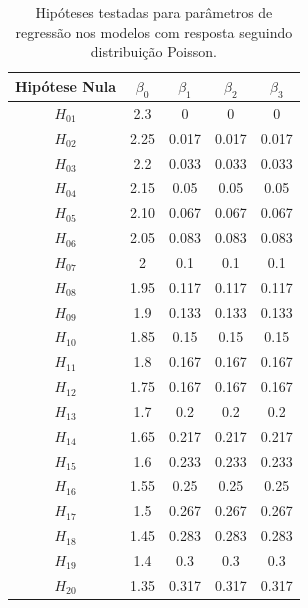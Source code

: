 \documentclass[AMA,STIX1COL]{WileyNJD-v2}
\begin{document}
\begin{table}[H]
\centering
\begin{tabular}{c|cccc}
\hline
Hipótese Nula & $\beta_0$ & $\beta_1$ & $\beta_2$ & $\beta_3$ \\ \hline
$H_{01}$      & 2.3       & 0         & 0         & 0         \\
$H_{02}$      & 2.25      & 0.017     & 0.017     & 0.017     \\
$H_{03}$      & 2.2       & 0.033     & 0.033     & 0.033     \\
$H_{04}$      & 2.15      & 0.05      & 0.05      & 0.05      \\
$H_{05}$      & 2.10      & 0.067     & 0.067     & 0.067     \\
$H_{06}$      & 2.05      & 0.083     & 0.083     & 0.083     \\
$H_{07}$      & 2         & 0.1       & 0.1       & 0.1       \\
$H_{08}$      & 1.95      & 0.117     & 0.117     & 0.117     \\
$H_{09}$      & 1.9       & 0.133     & 0.133     & 0.133     \\
$H_{10}$      & 1.85      & 0.15      & 0.15      & 0.15      \\
$H_{11}$      & 1.8       & 0.167     & 0.167     & 0.167     \\
$H_{12}$      & 1.75      & 0.167     & 0.167     & 0.167     \\
$H_{13}$      & 1.7       & 0.2       & 0.2       & 0.2       \\
$H_{14}$      & 1.65      & 0.217     & 0.217     & 0.217     \\
$H_{15}$      & 1.6       & 0.233     & 0.233     & 0.233     \\
$H_{16}$      & 1.55      & 0.25      & 0.25      & 0.25      \\
$H_{17}$      & 1.5       & 0.267     & 0.267     & 0.267     \\
$H_{18}$      & 1.45      & 0.283     & 0.283     & 0.283     \\
$H_{19}$      & 1.4       & 0.3       & 0.3       & 0.3       \\
$H_{20}$      & 1.35      & 0.317     & 0.317     & 0.317      \\ \hline
\end{tabular}
\caption{Hipóteses testadas para parâmetros de regressão nos modelos com resposta seguindo distribuição Poisson.}
\label{tab:hipoteses_beta_poisson}
\end{table}
\end{document}
